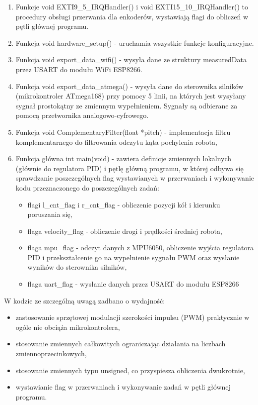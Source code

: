 \documentclass[a4paper,12pt,twoside,openany]{report}
\begin{document}
\begin{enumerate}
\item Funkcje void EXTI9\_5\_IRQHandler() i void EXTI15\_10\_IRQHandler() to procedury obsługi przerwania dla enkoderów, wystawiają flagi do obliczeń w pętli głównej programu.
\item Funkcja void hardware\_setup() - uruchamia wszystkie funkcje konfiguracyjne.
\item Funkcja void export\_data\_wifi() - wysyła dane ze struktury measuredData przez USART do modułu WiFi ESP8266.
\item Funkcja void export\_data\_atmega() - wysyła dane do sterownika silników (mikrokontroler ATmega168) przy pomocy 5 linii, na których jest wysyłany sygnał prostokątny ze zmiennym wypełnieniem. Sygnały są odbierane za pomocą przetwornika analogowo-cyfrowego.
\item Funkcja void ComplementaryFilter(float *pitch) - implementacja filtru komplementarnego do filtrowania odczytu kąta pochylenia robota,
\item Funkcja główna int main(void) - zawiera definicje zmiennych lokalnych (głównie do regulatora PID) i pętlę główną programu, w której odbywa się sprawdzanie poszczególnych flag wystawianych w przerwaniach i wykonywanie kodu przeznaczonego do poszczególnych zadań:
\begin{itemize}
\item flagi l\_cnt\_flag i r\_cnt\_flag - obliczenie pozycji kół i kierunku poruszania się,
\item flaga velocity\_flag - obliczenie drogi i prędkości średniej robota,
\item flaga mpu\_flag - odczyt danych z MPU6050, obliczenie wyjścia regulatora PID i przekształcenie go na wypełnienie sygnału PWM oraz wysłanie wyników do sterownika silników,
\item flaga uart\_flag - wysłanie danych przez USART do modułu ESP8266
\end{itemize}
\end{enumerate}

W kodzie ze szczególną uwagą zadbano o wydajność:
\begin{itemize}
\item zastosowanie sprzętowej modulacji szerokości impulsu (PWM) praktycznie w ogóle nie obciąża mikrokontrolera,
\item stosowanie zmiennych całkowitych ograniczając działania na liczbach zmiennoprzecinkowych,
\item stosowanie zmiennych typu unsigned, co przyspiesza obliczenia dwukrotnie,
\item wystawianie flag w przerwaniach i wykonywanie zadań w pętli głównej programu.
\end{itemize}
\end{document}
